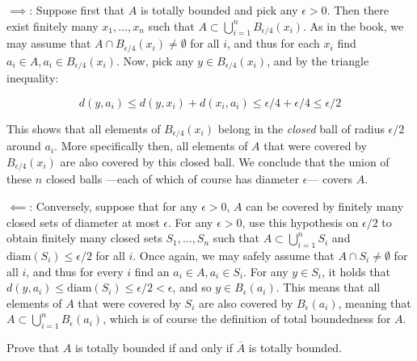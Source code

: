 \begin{solution}
    
    $\implies$: Suppose first that $A$ is totally bounded and pick any $\epsilon > 0$.
    Then there exist finitely many $x_1, \ldots, x_n$ such that $A \subset \bigcup_{i=1}^{n} B_{\epsilon/4}(x_i)$.
    As in the book, we may assume that $A \cap B_{\epsilon/4}(x_i) \neq \emptyset$ for all $i$, and thus for each $x_i$ find $a_i \in A, a_i \in B_{\epsilon/4}(x_i)$.
    Now, pick any $y \in B_{\epsilon/4}(x_i)$, and by the triangle inequality:

    \[d(y, a_i) \leq d(y, x_i) + d(x_i, a_i) \leq \epsilon/4 + \epsilon/4 \leq \epsilon/2\]

    This shows that all elements of $B_{\epsilon/4}(x_i)$ belong in the \textit{closed} ball of radius $\epsilon/2$ around $a_i$.
    More specifically then, all elements of $A$ that were covered by $B_{\epsilon/4}(x_i)$ are also covered by this closed ball.
    We conclude that the union of these $n$ closed balls ---each of which of course has diameter $\epsilon$--- covers $A$.

    $\impliedby$: Conversely, suppose that for any $\epsilon > 0$, $A$ can be covered by finitely many closed sets of diameter at most $\epsilon$.
    For any $\epsilon > 0$, use this hypothesis on $\epsilon/2$ to obtain finitely many closed sets $S_1, \ldots, S_n$ such that $A \subset \bigcup_{i=1}^{n} S_i$ and $\text{diam}(S_i) \leq \epsilon/2$ for all $i$.
    Once again, we may safely assume that $A \cap S_i \neq \emptyset$ for all $i$, and thus for every $i$ find an $a_i \in A, a_i \in S_i$.
    For any $y \in S_i$, it holds that $d(y, a_i) \leq \text{diam}(S_i) \leq \epsilon/2 < \epsilon$, and so $y \in B_{\epsilon}(a_i)$.
    This means that all elements of $A$ that were covered by $S_i$ are also covered by $B_{\epsilon}(a_i)$, meaning that $A \subset \bigcup_{i=1}^{n} B_{\epsilon}(a_i)$, which is of course the definition of total boundedness for $A$.
\end{solution}

\begin{exercise}{5}
    Prove that $A$ is totally bounded if and only if $\overline{A}$ is totally bounded.
\end{exercise}

